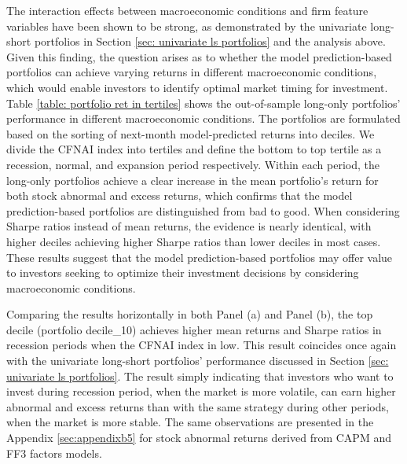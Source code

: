 The interaction effects between macroeconomic conditions and firm feature variables have been shown to be strong, as demonstrated by the univariate long-short portfolios in Section \ref{sec: univariate ls portfolios} and the analysis above. Given this finding, the question arises as to whether the model prediction-based portfolios can achieve varying returns in different macroeconomic conditions, which would enable investors to identify optimal market timing for investment. Table \ref{table: portfolio ret in tertiles} shows the out-of-sample long-only portfolios' performance in different macroeconomic conditions. The portfolios are formulated based on the sorting of next-month model-predicted returns into deciles. We divide the CFNAI index into tertiles and define the bottom to top tertile as a recession, normal, and expansion period respectively. Within each period, the long-only portfolios achieve a clear increase in the mean portfolio's return for both stock abnormal and excess returns, which confirms that the model prediction-based portfolios are distinguished from bad to good. When considering Sharpe ratios instead of mean returns, the evidence is nearly identical, with higher deciles achieving higher Sharpe ratios than lower deciles in most cases. These results suggest that the model prediction-based portfolios may offer value to investors seeking to optimize their investment decisions by considering macroeconomic conditions.

Comparing the results horizontally in both Panel (a) and Panel (b), the top decile (portfolio decile\_10) achieves higher mean returns and Sharpe ratios in recession periods when the CFNAI index in low. This result coincides once again with the univariate long-short portfolios' performance discussed in Section \ref{sec: univariate ls portfolios}. The result simply indicating that investors who want to invest during recession period, when the market is more volatile, can earn higher abnormal and excess returns than with the same strategy during other periods, when the market is more stable. The same observations are presented in the Appendix \ref{sec:appendixb5} for stock abnormal returns derived from CAPM and FF3 factors models.

